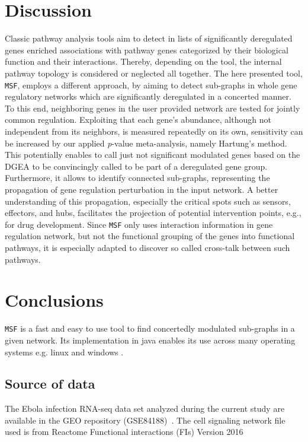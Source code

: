 \documentclass[10pt,a4paper,twocolumn]{article}
\begin{document}
\section*{Discussion}

Classic pathway analysis tools aim to detect in lists of significantly
deregulated genes enriched associations with pathway genes categorized by
their biological function and their interactions. Thereby, depending on the
tool, the internal pathway topology is considered or neglected all
together. The here presented tool, \texttt{MSF}, employs a different
approach, by aiming to detect sub-graphs in whole gene regulatory networks
which are significantly deregulated in a concerted manner. To this end,
neighboring genes in the user provided network are tested for jointly
common regulation. Exploiting that each gene's abundance, although not
independent from its neighbors, is measured repeatedly on its own,
sensitivity can be increased by our applied \textit{p}-value meta-analysis, namely
Hartung's method. This potentially enables to call just not significant
modulated genes based on the DGEA to be convincingly called to be part of a
deregulated gene group.  Furthermore, it allows to identify connected
sub-graphs, representing the propagation of gene regulation perturbation in
the input network. A better understanding of this propagation, especially
the critical spots such as sensors, effectors, and hubs, facilitates the projection of potential intervention points,
e.g., for drug development. Since \texttt{MSF} only uses interaction
information in gene regulation network, but not the functional grouping of
the genes into functional pathways, it is especially adapted to discover so
called cross-talk between such pathways.


\section*{Conclusions}


\texttt{MSF} is a fast and easy to use tool to find concertedly
modulated sub-graphs in a given network. Its implementation in java enables
its use across many operating systems e.g. linux and windows .

\subsection*{Source of data}

The Ebola infection RNA-seq data set analyzed during the current study are
available in the GEO repository (GSE84188)~\cite{Olejnik}. The cell
signaling network file used is from Reactome Functional interactions (FIs)
Version 2016~\cite{Cytokegg}
\end{document}
